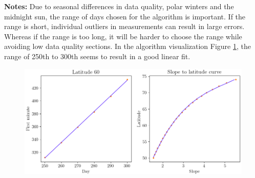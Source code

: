 \noindent
\textbf{Notes:}
Due to seasonal differences in data quality, polar winters and the midnight sun, the range of days chosen for the algorithm is important. If the range is short, individual outliers in measurements can result in large errors. Whereas if the range is too long, it will be harder to choose the range while avoiding low data quality sections. In the algorithm visualization Figure \ref{fig_slope_to_latitude}, the range of 250th to 300th seems to result in a good linear fit.
\newpage

\begin{figure}[ht!]
\centering
\includegraphics[width=1\linewidth]{pics/slope_to_latitude3}



\label{fig_slope_to_latitude}
\end{figure}



